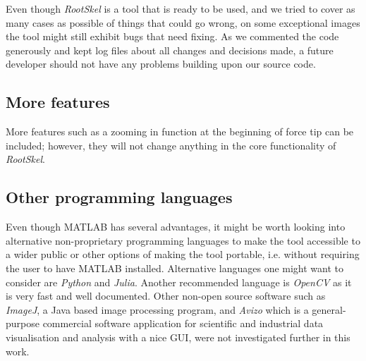 Even though \textit{RootSkel} is a tool that is ready to be used, and we tried to cover as many cases as possible of things that could go wrong, on some exceptional images the tool might still exhibit bugs that need fixing.
As we commented the code generously and kept log files about all changes and decisions made, a future developer should not have any problems building upon our source code.



\subsection{More features}

More features such as a zooming in function at the beginning of force tip can be included; however, they will not change anything in the core functionality of \textit{RootSkel}.



\subsection{Other programming languages}

Even though MATLAB has several advantages, it might be worth looking into alternative non-proprietary programming languages to make the tool accessible to a wider public or other options of making the tool portable, i.e. without requiring the user to have MATLAB installed.
Alternative languages one might want to consider are \textit{Python} and \textit{Julia}. Another recommended language is \textit{OpenCV} as it is very fast and well documented. Other non-open source software such as \textit{ImageJ}, a Java based image processing program, and \textit{Avizo} which is a general-purpose commercial software application for scientific and industrial data visualisation and analysis with a nice GUI, were not investigated further in this work. 


